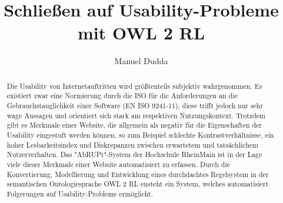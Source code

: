 \documentclass[runningheads,a4paper]{llncs}
\begin{document}
\mainmatter  %

\title{Schließen auf Usability-Probleme mit OWL 2 RL}


%
%
\author{Manuel Dudda}
%


%
%

\maketitle

\renewcommand{\abstractname}{Abstract}
\begin{abstract}
Die Usability von Internetauftritten wird größtenteils subjektiv wahrgenommen. 
Es existiert zwar eine Normierung durch die ISO für die Anforderungen an die Gebrauchstauglichkeit einer Software (EN ISO 9241-11), diese trifft jedoch nur sehr wage Aussagen und orientiert sich stark am respektiven Nutzungskontext. 
Trotzdem gibt es Merkmale einer Website, die allgemein als negativ für die Eigenschaften der Usability eingestuft werden können, so zum Beispiel schlechte Kontrastverhältnisse, ein hoher Lesbarkeitsindex und Diskrepanzen zwischen erwartetem und tatsächlichem Nutzerverhalten. 
Das "{}AbRUPt"{}-System der Hochschule RheinMain ist in der Lage viele dieser Merkmale einer Website automatisiert zu erfassen. 
Durch die Konvertierung, Modellierung und Entwicklung eines durchdachtes Regelsystem in der semantischen Ontologiesprache OWL 2 RL ensteht ein System, welches automatisiert Folgerungen auf Usability-Probleme ermöglicht.
\end{abstract}
\end{document}
